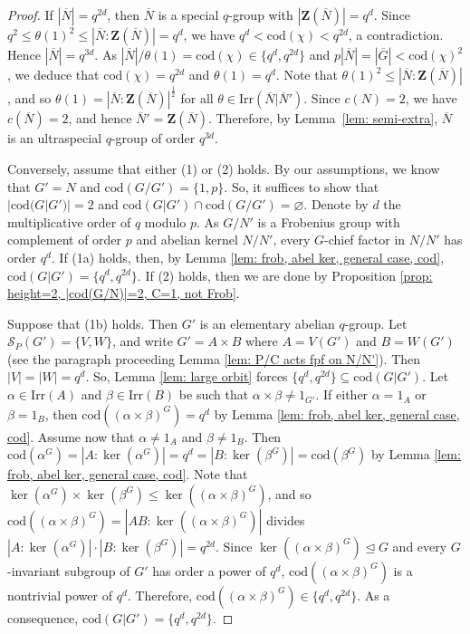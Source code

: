 \documentclass[9pt]{article}
\begin{document}
\begin{proof}
    If $|\overline{N}|=q^{2d}$,
	then $\overline{N}$ is a special $q$-group with $|\mathbf{Z}(\overline{N})|=q^{d}$.
	Since $q^{2}\leq \theta(1)^{2}\leq |\overline{N}: \mathbf{Z}(\overline{N})|=q^{d}$,
    we have $q^{d}<\mathrm{cod}(\chi)<q^{2d}$, a contradiction.
	Hence $|\overline{N}|=q^{3d}$.
	As $|\overline{N}|/\theta(1)=\mathrm{cod}(\chi)\in \{ q^{d}, q^{2d} \}$ 
	and $p|\overline{N}|=|\overline{G}|<\mathrm{cod}(\chi)^{2}$,
	we deduce that $\mathrm{cod}(\chi)=q^{2d}$ and $\theta(1)=q^{d}$.
	Note that $\theta(1)^{2}\leq |\overline{N}:\mathbf{Z}(\overline{N})|$,
	and so $\theta(1)=|\overline{N}:\mathbf{Z}(\overline{N})|^{\frac{1}{2}}$ for all $\theta\in \mathrm{Irr}(\overline{N}|\overline{N}')$.
    Since $c(N)=2$, we have $c(\overline{N})=2$, and hence $\overline{N}'=\mathbf{Z}(\overline{N})$.  
    Therefore, by Lemma~\ref{lem: semi-extra}, $\overline{N}$ is an ultraspecial $q$-group of order $q^{3d}$.

	Conversely, assume that either (1) or (2) holds.
	By our assumptions, we know that
	$G'=N$ and $\mathrm{cod}(G/G')=\{ 1,p \}$.
    So, it suffices to show that $|\mathrm{cod}(G|G')|=2$ and $\mathrm{cod}(G|G')\cap \mathrm{cod}(G/G')=\varnothing$.
    Denote by $d$ the multiplicative order of $q$ modulo $p$.
    As $G/N'$ is a Frobenius group with complement of order $p$ and abelian kernel $N/N'$,
	every $G$-chief factor in $N/N'$ has order $q^{d}$.
    If (1a) holds, then, by Lemma \ref{lem: frob, abel ker, general case, cod}, $\mathrm{cod}(G|G')=\{q^{d}, q^{2d} \}$.
	If (2) holds,
    then we are done by Proposition \ref{prop: height=2, |cod(G/N)|=2, C=1, not Frob}.


	Suppose that (1b) holds.
	Then $G'$ is an elementary abelian $q$-group.
	Let $\mathcal{S}_P(G')=\{ V,W \}$, and write $G'=A\times B$ where $A=V(G')$ and $B=W(G')$ (see the paragraph proceeding Lemma \ref{lem: P/C acts fpf on N/N'}).
	Then $|V|=|W|=q^{d}$.
	So, Lemma \ref{lem: large orbit} forces $\{ q^{d},q^{2d} \}\subseteq \mathrm{cod}(G|G')$.
	Let $\alpha\in \mathrm{Irr}(A)$ and $\beta\in \mathrm{Irr}(B)$ be such that $\alpha\times \beta\neq 1_{G'}$.
    If either $\alpha=1_A$ or $\beta=1_B$, then $\mathrm{cod}((\alpha\times \beta)^{G})=q^{d}$ by Lemma \ref{lem: frob, abel ker, general case, cod}.
	Assume now that $\alpha\neq 1_A$ and $\beta\neq 1_B$.
	Then $\mathrm{cod}(\alpha^G)=|A:\ker(\alpha^G)|=q^{d}=|B:\ker(\beta^{G})|=\mathrm{cod}(\beta^{G})$ by Lemma \ref{lem: frob, abel ker, general case, cod}.
    Note that $\ker(\alpha^G)\times \ker(\beta^{G})\leq \ker((\alpha\times \beta)^{G})$,
	and so $\mathrm{cod}((\alpha\times \beta)^{G})=|AB:\ker((\alpha\times \beta)^{G})|$ divides $|A:\ker(\alpha^G)|\cdot |B:\ker(\beta^{G})|=q^{2d}$.
    Since $\ker((\alpha\times \beta)^{G})\unlhd G$ and every $G$-invariant subgroup of $G'$ has order
	a power of $q^{d}$, $\mathrm{cod}((\alpha\times \beta)^{G})$ is a nontrivial power of $q^{d}$.
	Therefore, $\mathrm{cod}((\alpha\times \beta)^{G})\in \{ q^{d},q^{2d} \}$.
	As a consequence, $\mathrm{cod}(G|G')=\{q^{d}, q^{2d} \}$.



\end{proof}
\end{document}
